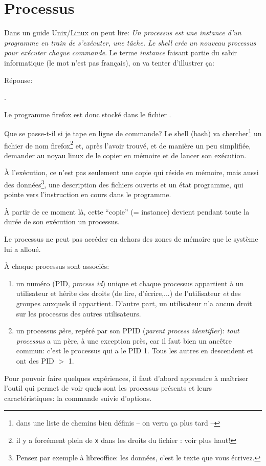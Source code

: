 \section{Processus}
Dans un guide Unix/Linux on peut lire: \emph{\og Un processus est une
instance d'un programme en train de s'exécuter, une tâche. Le shell
crée un nouveau processus pour exécuter chaque
commande\fg}. Le terme \emph{instance} faisant partie du sabir
informatique (le mot n'est pas français), on va tenter d'illustrer ça:\smallskip


Réponse:

.

Le programme firefox est donc stocké dans le fichier .

Que se passe-t-il si je tape  en ligne de
commande? Le shell (bash) va chercher\footnote{dans une liste
  de chemins bien définis -- on verra ça plus tard --} un fichier de nom
firefox\footnote{il y a forcément plein de \texttt{x} dans les droits
  du fichier : voir plus
  haut!} et, après l'avoir trouvé,
et de manière un peu simplifiée, demander au noyau linux de le copier
en mémoire et de lancer son exécution.

\`A l'exécution, ce n'est pas seulement une copie qui réside en
mémoire, mais aussi des données\footnote{Pensez par exemple à
  libreoffice: les données, c'est le texte que vous écrivez.},  une
description des fichiers ouverts 
et un \og état programme\fg, qui pointe vers l'instruction en cours
dans le programme.

\`A partir de ce moment là,
cette ``copie'' (= instance) devient pendant toute la durée de son
exécution un \textsf{processus}.

 Le processus ne peut pas accéder en dehors des 
zones de mémoire que le système lui a alloué.


\`A chaque processus sont associés:
\begin{enumerate}
\item un numéro (PID, \textsl{process id}) unique et chaque
processus appartient à un utilisateur et hérite des droits (de lire,
d'écrire,...) de l'utilisateur \emph{et} des groupes auxquels il
appartient. D'autre part, un utilisateur n'a aucun droit sur les
processus des autres utilisateurs.
\item un processus \emph{père}, repéré par son PPID (\textsl{parent
  process identifier}): \emph{tout processus} a un père, à une
  exception près, car 
  il faut bien  un ancêtre commun: c'est le
  processus  qui a le PID 1. Tous les autres en descendent
  et ont des PID $>$ 1.
\end{enumerate}
Pour pouvoir faire quelques expériences, il faut d'abord apprendre à
maîtriser l'outil qui permet de  voir quels sont les processus
présents et leurs caractéristiques:  la
commande  suivie d'options.

